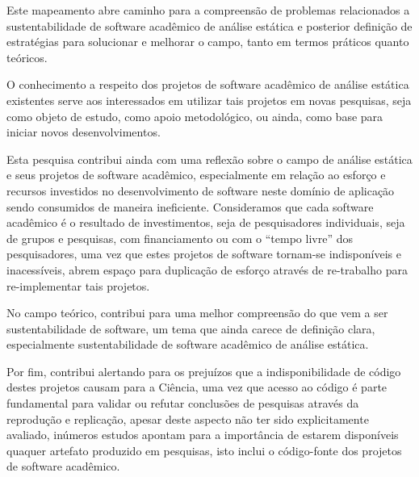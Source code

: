 Este mapeamento abre caminho para a compreensão de problemas relacionados a 
sustentabilidade de software acadêmico de análise estática 
e posterior definição de estratégias para
solucionar e melhorar o campo, tanto em termos práticos quanto teóricos.

O conhecimento a respeito dos projetos de software acadêmico de análise estática
existentes serve aos interessados em utilizar tais projetos em novas pesquisas,
seja como objeto de estudo, como apoio metodológico, ou ainda, como base para
iniciar novos desenvolvimentos.


Esta pesquisa contribui ainda com uma reflexão sobre o campo de análise
estática e seus projetos de software acadêmico, especialmente em relação ao
esforço e recursos investidos no desenvolvimento de software neste domínio de
aplicação sendo consumidos de maneira ineficiente. Consideramos que cada software
acadêmico é o resultado de investimentos, seja de pesquisadores individuais, seja
de grupos e pesquisas, com financiamento ou com o ``tempo livre'' dos pesquisadores,
uma vez que estes projetos de software tornam-se indisponíveis e inacessíveis,
abrem espaço para duplicação de esforço através de re-trabalho para re-implementar
tais projetos.


No campo teórico, contribui para uma melhor compreensão do que vem a ser
sustentabilidade de software, um tema que ainda carece de definição clara,
especialmente sustentabilidade de software acadêmico de análise estática.


Por fim, contribui alertando para os prejuízos que a indisponibilidade de
código destes projetos causam para a Ciência, uma vez que acesso ao código é
parte fundamental para validar ou refutar conclusões de pesquisas através da
reprodução e replicação, apesar deste aspecto não ter sido explicitamente avaliado,
inúmeros estudos apontam para a importância de estarem disponíveis quaquer
artefato produzido em pesquisas, isto inclui o código-fonte dos projetos de
software acadêmico.

